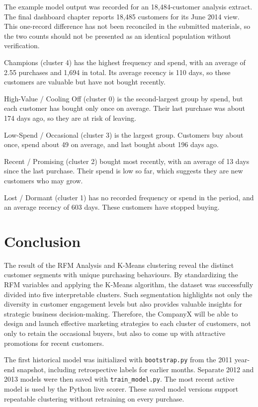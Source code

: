 The example model output was recorded for an 18,484-customer analysis extract. The final dashboard chapter reports
18,485 customers for its June 2014 view. This one-record difference has not been reconciled in the submitted materials,
so the two counts should not be presented as an identical population without verification.

Champions (cluster 4) has the highest frequency and spend, with an average of 2.55 purchases and 1,694 in total. Its
average recency is 110 days, so these customers are valuable but have not bought recently.

High-Value / Cooling Off (cluster 0) is the second-largest group by spend, but each customer has bought only once on
average. Their last purchase was about 174 days ago, so they are at risk of leaving.

Low-Spend / Occasional (cluster 3) is the largest group. Customers buy about once, spend about 49 on average, and last
bought about 196 days ago.

Recent / Promising (cluster 2) bought most recently, with an average of 13 days since the last purchase. Their spend is
low so far, which suggests they are new customers who may grow.

Lost / Dormant (cluster 1) has no recorded frequency or spend in the period, and an average recency of 603 days. These
customers have stopped buying.

\section{Conclusion}

The result of the RFM Analysis and K-Means clustering reveal the distinct customer segments with unique purchasing
behaviours. By standardizing the RFM variables and applying the K-Means algorithm, the dataset was successfully divided
into five interpretable clusters. Such segmentation highlights not only the diversity in customer engagement levels but
also provides valuable insights for strategic business decision-making. Therefore, the CompanyX will be able to design
and launch effective marketing strategies to each cluster of customers, not only to retain the occasional buyers, but
also to come up with attractive promotions for recent customers.

The first historical model was initialized with \texttt{bootstrap.py} from the 2011 year-end snapshot, including
retrospective labels for earlier months. Separate 2012 and 2013 models were then saved with \texttt{train\_model.py}.
The most recent active model is used by the Python live scorer. These saved model versions support repeatable
clustering without retraining on every purchase.

